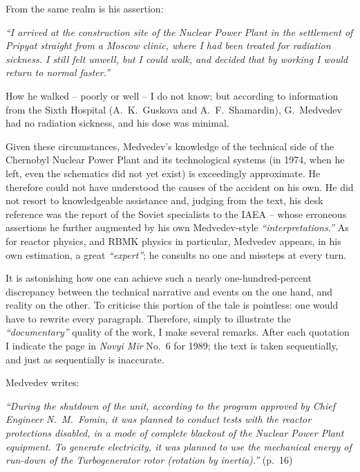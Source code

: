 \documentclass[openright]{bookest}
\begin{document}
From the same realm is his assertion:

\begin{personal}
\textit{``I arrived at the construction site of the Nuclear Power Plant in the settlement of Pripyat straight from a Moscow clinic, where I had been treated for radiation sickness. I still felt unwell, but I could walk, and decided that by working I would return to normal faster.''}
\end{personal}

How he walked -- poorly or well -- I do not know; but according to information from the Sixth Hospital (A.~K.~Guskova and A.~F.~Shamardin), G.~Medvedev had no radiation sickness, and his dose was minimal.

Given these circumstances, Medvedev's knowledge of the technical side of the Chernobyl Nuclear Power Plant and its technological systems (in 1974, when he left, even the schematics did not yet exist) is exceedingly approximate. He therefore could not have understood the causes of the accident on his own. He did not resort to knowledgeable assistance and, judging from the text, his desk reference was the report of the Soviet specialists to the IAEA -- whose erroneous assertions he further augmented by his own Medvedev-style \textit{``interpretations.''} As for reactor physics, and RBMK physics in particular, Medvedev appears, in his own estimation, a great \textit{``expert''}; he consults no one and missteps at every turn.

It is astonishing how one can achieve such a nearly one-hundred-percent discrepancy between the technical narrative and events on the one hand, and reality on the other. To criticise this portion of the tale is pointless: one would have to rewrite every paragraph. Therefore, simply to illustrate the \textit{``documentary''} quality of the work, I make several remarks. After each quotation I indicate the page in \textit{Novyi Mir} No.~6 for 1989; the text is taken sequentially, and just as sequentially is inaccurate.

Medvedev writes:

\begin{personal}
\textit{``During the shutdown of the unit, according to the program approved by Chief Engineer N.~M.~Fomin, it was planned to conduct tests with the reactor protections disabled, in a mode of complete blackout of the Nuclear Power Plant equipment. To generate electricity, it was planned to use the mechanical energy of run-down of the Turbogenerator rotor (rotation by inertia).''} (p.~16)
\end{personal}
\end{document}
